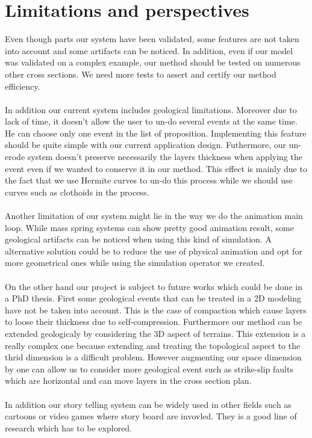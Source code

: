 \documentclass[12pt, a4paper]{report} %
\begin{document}
\chapter{Limitations and perspectives}

Even though parts our system have been validated, some features are not taken into account and some artifacts can be noticed. In addition, even if our model was validated on a complex example, our method should be tested on numerous other cross sections. We need more tests to assert and certify our method efficiency.\\\\
In addition our current system includes geological limitations. Moreover due to lack of time, it doesn't allow the user to un-do several events at the same time. He can choose only one event in the list of proposition. Implementing this feature should be quite simple with our current application design.
Futhermore, our un-erode system doesn't preserve necessarily the layers thickness when applying the event even if we wanted to conserve it in our method. This effect is mainly due to the fact that we use Hermite curves to un-do this process while we should use curves such as clothoids in the process.\\\\
Another limitation of our system might lie in the way we do the animation main loop. While mass spring systems can show pretty good animation result, some geological artifacts can be noticed when using this kind of simulation. A alternative solution could be to reduce the use of physical animation and opt for more geometrical ones while using the simulation operator we created.\\\\
On the other hand our project is subject to future works which could be done in a PhD thesis. 
First some geological events that can be treated in a 2D modeling have not be taken into account. This is the case of compaction which cause layers to loose their thickness due to self-compression. Furthermore our method can be extended geologicaly by considering the 3D aspect of terrains. This extension is a really complex one because extending and treating the topological aspect to the thrid dimension is a difficult problem. However augmenting our space dimension by one can allow us to consider more geological event such as strike-slip faults which are horizontal and can move layers in the cross section plan. \\\\
In addition our story telling system can be widely used in other fields such as cartoons or video games where story board are invovled. They is a good line of research which has to be explored.
\end{document}
